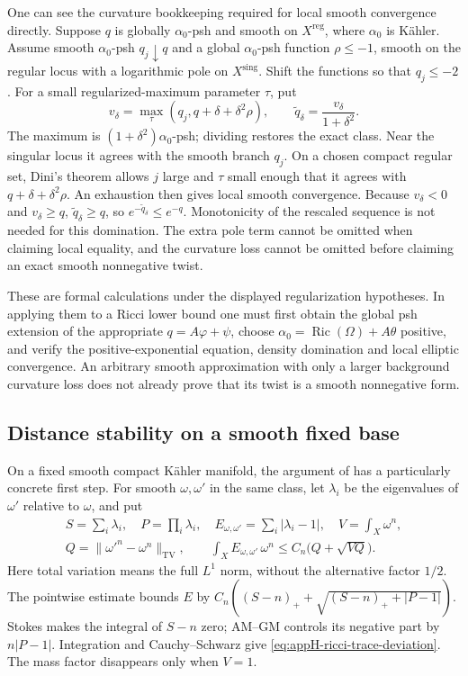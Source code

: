 One can see the curvature bookkeeping required for local
smooth convergence directly. Suppose \(q\) is globally
\(\alpha_0\)-psh and smooth on \(X^{\mathrm{reg}}\), where
\(\alpha_0\) is Kähler. Assume smooth
\(\alpha_0\)-psh \(q_j\downarrow q\) and a global
\(\alpha_0\)-psh function \(\rho\leq-1\), smooth on the
regular locus with a logarithmic pole on \(X^{\mathrm{sing}}\).
Shift the functions so that \(q_j\leq-2\). For a small
regularized-maximum parameter \(\tau\), put
\[
 v_\delta=\operatorname{max}_{\tau}
              (q_j,q+\delta+\delta^2\rho),\qquad
 \widetilde q_\delta=\frac{v_\delta}{1+\delta^2}.
 \tag{H.168}\label{eq:appH-ricci-exact-class-max}
\]
The maximum is \((1+\delta^2)\alpha_0\)-psh; dividing restores
the exact class. Near the singular locus it agrees with the
smooth branch \(q_j\). On a chosen compact regular set,
Dini's theorem allows \(j\) large and \(\tau\) small enough
that it agrees with \(q+\delta+\delta^2\rho\).
An exhaustion then gives local smooth convergence.
Because \(v_\delta<0\) and \(v_\delta\geq q\),
\(\widetilde q_\delta\geq q\), so
\(e^{-\widetilde q_\delta}\leq e^{-q}\).
Monotonicity of the rescaled sequence is not needed for this
domination. The extra pole term cannot be omitted when
claiming local equality, and the curvature loss cannot be
omitted before claiming an exact smooth nonnegative twist.

These are formal calculations under the displayed
regularization hypotheses. In applying them to a Ricci lower
bound one must first obtain the global psh extension of the
appropriate \(q=A\varphi+\psi\), choose
\(\alpha_0=\operatorname{Ric}(\Omega)+A\theta\) positive,
and verify the positive-exponential equation, density domination
and local elliptic convergence. An arbitrary smooth approximation
with only a larger background curvature loss does not already
prove that its twist is a smooth nonnegative form.

\subsection{Distance stability on a smooth fixed base}

On a fixed smooth compact Kähler manifold, the argument of
\cite{GSS26GeometricStabilityV1} has a particularly concrete
first step. For smooth \(\omega,\omega'\) in the same class,
let \(\lambda_i\) be the eigenvalues of \(\omega'\) relative
to \(\omega\), and put
\[
 \begin{gathered}
 S=\sum_i\lambda_i,\quad P=\prod_i\lambda_i,\quad
 E_{\omega,\omega'}=\sum_i|\lambda_i-1|,\quad
 V=\int_X\omega^n,\\
 Q=\|\omega'^n-\omega^n\|_{\mathrm{TV}},\qquad
 \int_XE_{\omega,\omega'}\,\omega^n
                    \leq C_n\bigl(Q+\sqrt{VQ}\bigr).
 \end{gathered}
 \tag{H.169}\label{eq:appH-ricci-trace-deviation}
\]
Here total variation means the full \(L^1\) norm, without
the alternative factor \(1/2\).
The pointwise estimate bounds \(E\) by
\(C_n((S-n)_++\sqrt{(S-n)_++|P-1|})\).
Stokes makes the integral of \(S-n\) zero; AM--GM controls
its negative part by \(n|P-1|\). Integration and
Cauchy--Schwarz give \eqref{eq:appH-ricci-trace-deviation}.
The mass factor disappears only when \(V=1\).

